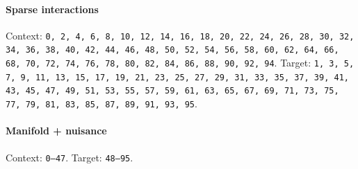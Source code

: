 \paragraph{Sparse interactions} Context: \texttt{0, 2, 4, 6, 8, 10, 12, 14, 16, 18, 20, 22, 24, 26, 28, 30, 32, 34, 36, 38, 40, 42, 44, 46, 48, 50, 52, 54, 56, 58, 60, 62, 64, 66, 68, 70, 72, 74, 76, 78, 80, 82, 84, 86, 88, 90, 92, 94}. Target: \texttt{1, 3, 5, 7, 9, 11, 13, 15, 17, 19, 21, 23, 25, 27, 29, 31, 33, 35, 37, 39, 41, 43, 45, 47, 49, 51, 53, 55, 57, 59, 61, 63, 65, 67, 69, 71, 73, 75, 77, 79, 81, 83, 85, 87, 89, 91, 93, 95}.

\paragraph{Manifold + nuisance} Context: \texttt{0--47}. Target: \texttt{48--95}.

